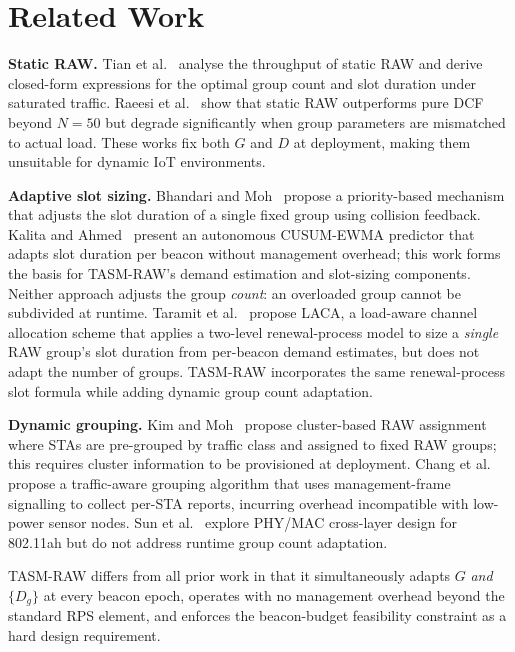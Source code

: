 \documentclass[conference]{IEEEtran}
\begin{document}
\section{Related Work}
\label{sec:related}

\textbf{Static RAW.}
Tian et al.~\cite{tian2016} analyse the throughput of static RAW and
derive closed-form expressions for the optimal group count and slot
duration under saturated traffic.
Raeesi et al.~\cite{raeesi2014} show that static RAW outperforms pure DCF
beyond $N\!=\!50$ but degrade significantly when group parameters are
mismatched to actual load.
These works fix both $G$ and $D$ at deployment, making them unsuitable
for dynamic IoT environments.

\textbf{Adaptive slot sizing.}
Bhandari and Moh~\cite{bhandari2018} propose a priority-based mechanism
that adjusts the slot duration of a single fixed group using collision
feedback.
Kalita and Ahmed~\cite{kalita2025} present an autonomous CUSUM-EWMA
predictor that adapts slot duration per beacon without management overhead;
this work forms the basis for TASM-RAW's demand estimation and slot-sizing
components.
Neither approach adjusts the group \emph{count}: an overloaded group cannot
be subdivided at runtime.
Taramit et al.~\cite{taramit2023} propose LACA, a load-aware channel
allocation scheme that applies a two-level renewal-process model to size a
\emph{single} RAW group's slot duration from per-beacon demand estimates,
but does not adapt the number of groups.
TASM-RAW incorporates the same renewal-process slot formula while adding
dynamic group count adaptation.

\textbf{Dynamic grouping.}
Kim and Moh~\cite{kim2017} propose cluster-based RAW assignment where STAs
are pre-grouped by traffic class and assigned to fixed RAW groups; this
requires cluster information to be provisioned at deployment.
Chang et al.~\cite{chang2019} propose a traffic-aware grouping algorithm
that uses management-frame signalling to collect per-STA reports, incurring
overhead incompatible with low-power sensor nodes.
Sun et al.~\cite{sun2019phy} explore PHY/MAC cross-layer design for 802.11ah
but do not address runtime group count adaptation.

TASM-RAW differs from all prior work in that it simultaneously adapts $G$
\emph{and} $\{D_g\}$ at every beacon epoch, operates with no management
overhead beyond the standard RPS element, and enforces the beacon-budget
feasibility constraint as a hard design requirement.
\end{document}
